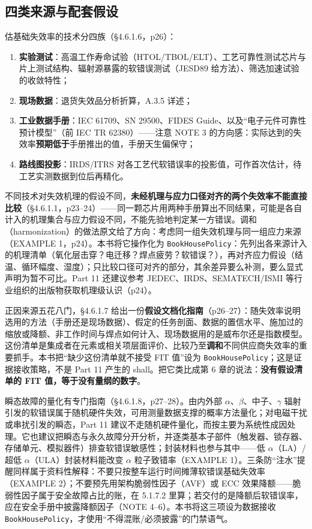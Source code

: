 \subsection{四类来源与配套假设}

估基础失效率的技术分四族（§4.6.1.6，p26）：

\begin{enumerate}
\item \textbf{实验测试}：高温工作寿命试验（HTOL/TBOL/ELT）、工艺可靠性测试芯片与片上测试结构、辐射源暴露的软错误测试（JESD89 给方法）、筛选加速试验的收敛特性；
\item \textbf{现场数据}：退货失效品分析折算，A.3.5 详述；
\item \textbf{工业数据手册}：IEC 61709、SN 29500、FIDES Guide、以及“电子元件可靠性预计模型”（前 IEC TR 62380）——注意 NOTE 3 的方向感：实际达到的失效率\textbf{预期低于}手册推出的值，手册天生偏保守；
\item \textbf{路线图投影}：IRDS/ITRS 对各工艺代软错误率的投影值，可作首次估计，待工艺实测数据到位后再精化。
\end{enumerate}

不同技术对失效机理的假设不同，\textbf{未经机理与应力口径对齐的两个失效率不能直接比较}（§4.6.1.1，p23–24）——同一颗芯片用两种手册算出不同结果，可能是各自计入的机理集合与应力假设不同，不能先验地判定某一方错误。调和（harmonization）的做法原文给了方向：考虑同一组失效机理与同一组应力来源（EXAMPLE 1，p24）。本书将它操作化为 \nolinkurl{BookHousePolicy}：先列出各来源计入的机理清单（氧化层击穿？电迁移？焊点疲劳？软错误？），再对齐应力假设（结温、循环幅度、湿度）；只比较口径可对齐的部分，其余差异要么补测，要么显式声明为暂不可比。Part 11 还建议参考 JEDEC、IRDS、SEMATECH/ISMI 等行业组织的出版物获取机理级认识（p24）。

正因来源五花八门，§4.6.1.7 给出一份\textbf{假设文档化指南}（p26–27）：随失效率说明选用的方法（手册还是现场数据）、假定的任务剖面、数据的置信水平、施加过的缩放或降额、非工作时间与焊点如何计入、现场数据用的是威布尔还是指数模型。这份清单是集成者在元素或相关项层面评价、比较乃至\textbf{调和}不同供应商失效率的重要抓手。本书把“缺少这份清单就不接受 FIT 值”设为 \nolinkurl{BookHousePolicy}；这是证据接收策略，不是 Part 11 产生的 shall。把它类比成第 6 章的说法：\textbf{没有假设清单的 FIT 值，等于没有量纲的数字}。

瞬态故障的量化有专门指南（§4.6.1.8，p27–28）。由内外部 \(\alpha\)、\(\beta\)、中子、\(\gamma\) 辐射引发的软错误属于随机硬件失效，可用测量数据支撑的概率方法量化；对电磁干扰或串扰引发的瞬态，Part 11 建议不走随机硬件量化，而按主要为系统性成因处理。它也建议把瞬态与永久故障分开分析，并逐类基本子部件（触发器、锁存器、存储单元、模拟器件）排查软错误敏感性；封装材料也参与其中——低 \(\alpha\)（LA）/超低 \(\alpha\)（ULA）封装材料能改变 \(\alpha\) 粒子致错率（EXAMPLE 1）。三条防“注水”提醒同样属于资料性解释：不要只按整车运行时间摊薄软错误基础失效率（EXAMPLE 2）；不要预先用架构脆弱性因子（AVF）或 ECC 效果降额——脆弱性因子属于安全故障占比的账，在 5.1.7.2 里算；若交付的是降额后软错误率，应在安全手册中披露降额因子（NOTE 4–6）。本书将这三项设为数据接收 \nolinkurl{BookHousePolicy}，才使用“不得混账/必须披露”的门禁语气。

